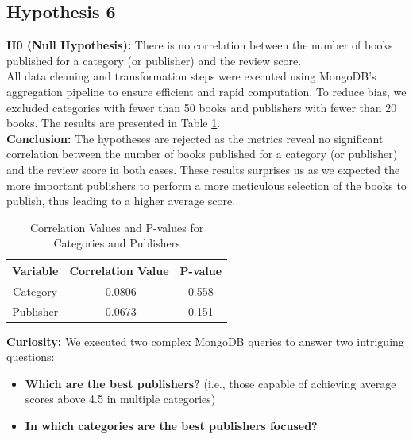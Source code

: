 \subsection*{Hypothesis 6}

\textbf{H0 (Null Hypothesis):} There is no correlation between the number of books published for a category (or publisher) and the review score.\\
All data cleaning and transformation steps were executed using MongoDB's aggregation pipeline to ensure efficient and rapid computation.
To reduce bias, we excluded categories with fewer than 50 books and publishers with fewer than 20 books.
The results are presented in Table \ref{tab:h6_correlations}.\\
\textbf{Conclusion:} The hypotheses are rejected as the metrics reveal no significant correlation between the number of books published
for a category (or publisher) and the review score in both cases. These results surprises us as we expected the more important publishers
to perform a more meticulous selection of the books to publish, thus leading to a higher average score.\\

\begin{table}[H]
    \footnotesize
    \centering
    \caption{Correlation Values and P-values for Categories and Publishers}
    \begin{tabular}{|c|c|c|}
        \hline
        \textbf{Variable} & \textbf{Correlation Value} & \textbf{P-value} \\
        \hline
        Category          & -0.0806                    & 0.558            \\
        \hline
        Publisher         & -0.0673                    & 0.151            \\
        \hline
    \end{tabular}
    \label{tab:h6_correlations}
\end{table}

\noindent
\textbf{Curiosity:}
We executed two complex MongoDB queries to answer two intriguing questions:

\begin{itemize}[leftmargin=*, noitemsep]
    \item \textbf{Which are the best publishers?} (i.e., those capable of achieving average scores above 4.5 in multiple categories)
    \item \textbf{In which categories are the best publishers focused?}
\end{itemize}

